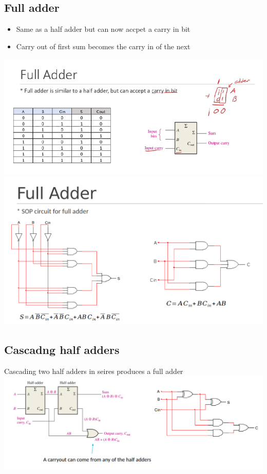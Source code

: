 \documentclass[a4paper,12pt]{article}
\begin{document}
        \subsection{Full adder}
            \begin{itemize}
                \item Same as a half adder but can now accpet a carry in bit
                \item Carry out of first sum becomes the carry in of the next
            \end{itemize}
            \includegraphics[width=15cm]{FullAdder1.png}\\
            \includegraphics[width=15cm]{FullAdder2.png}
            
            \subsection{Cascadng half adders}
                Cascading two half adders in seires produces a full adder\\
                \includegraphics*[width=15cm]{Cashalf.png}
\end{document}
